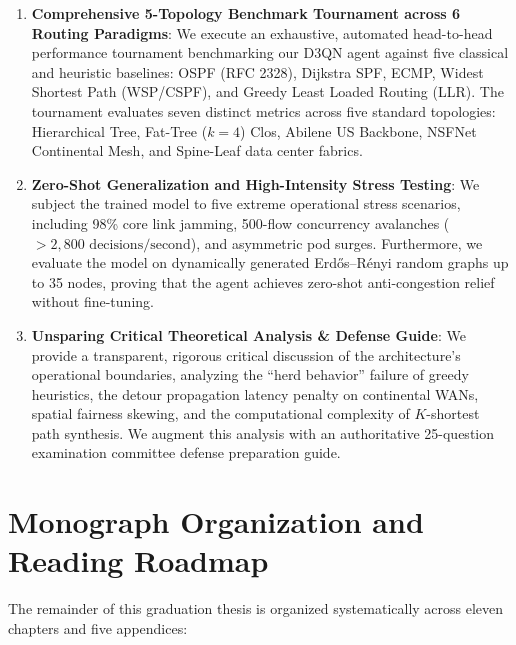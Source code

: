 \documentclass[12pt,a4paper,oneside]{report}
\begin{document}
\begin{enumerate}[label=\textbf{\arabic*.}]
    \item \textbf{Comprehensive 5-Topology Benchmark Tournament across 6 Routing Paradigms}:
    We execute an exhaustive, automated head-to-head performance tournament benchmarking our D3QN agent against five classical and heuristic baselines: OSPF (RFC 2328), Dijkstra SPF, ECMP, Widest Shortest Path (WSP/CSPF), and Greedy Least Loaded Routing (LLR). The tournament evaluates seven distinct metrics across five standard topologies: Hierarchical Tree, Fat-Tree ($k=4$) Clos, Abilene US Backbone, NSFNet Continental Mesh, and Spine-Leaf data center fabrics.
    
    \item \textbf{Zero-Shot Generalization and High-Intensity Stress Testing}:
    We subject the trained model to five extreme operational stress scenarios, including 98\% core link jamming, 500-flow concurrency avalanches ($> 2,800\text{ decisions/second}$), and asymmetric pod surges. Furthermore, we evaluate the model on dynamically generated Erd\H{o}s--R\'enyi random graphs up to 35 nodes, proving that the agent achieves zero-shot anti-congestion relief without fine-tuning.
    
    \item \textbf{Unsparing Critical Theoretical Analysis \& Defense Guide}:
    We provide a transparent, rigorous critical discussion of the architecture's operational boundaries, analyzing the ``herd behavior'' failure of greedy heuristics, the detour propagation latency penalty on continental WANs, spatial fairness skewing, and the computational complexity of $K$-shortest path synthesis. We augment this analysis with an authoritative 25-question examination committee defense preparation guide.
\end{enumerate}

\section{Monograph Organization and Reading Roadmap}
The remainder of this graduation thesis is organized systematically across eleven chapters and five appendices:
\end{document}
